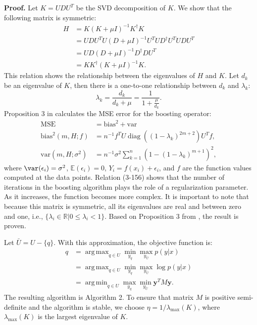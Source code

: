 \documentclass[12pt]{article}
\DeclareMathOperator*{\argmin}{arg\,min}
\DeclareMathOperator*{\argmax}{arg\,max}
\DeclareMathOperator{\diag}{diag}
\DeclareMathOperator{\MSE}{MSE}
\begin{document}
	\textbf{Proof.} Let $K = U D U^T$ be the SVD decomposition of $K$. We show that the following matrix is symmetric:
	\begin{align}
		H &= K(K + \mu I)^{-1} K^\dagger K \\
		&= U D U^T U (D + \mu I)^{-1} U^T U D^\dagger U^T U D U^T \\
		&= U D (D + \mu I)^{-1} D^\dagger D U^T \\
		&= K K^\dagger (K + \mu I)^{-1} K.
	\end{align}
	This relation shows the relationship between the eigenvalues of $H$ and $K$. Let $d_k$ be an eigenvalue of $K$, then there is a one-to-one relationship between $d_k$ and $\lambda_k$:
	\begin{equation}
		\lambda_k = \frac{d_k}{d_k + \mu} = \frac{1}{1 + \frac{\mu}{d_k}}.
	\end{equation}
	Proposition 3 in \cite{buhlmann2003boosting} calculates the MSE error for the boosting operator:
	\begin{align}
		\MSE &= \text{bias}^2 + \text{var} \\
		\text{bias}^2(m, H; f) &= n^{-1} f^T U \diag((1 - \lambda_k)^{2m+2}) U^T f, \\
		\text{var}(m, H; \sigma^2) &= n^{-1} \sigma^2 \sum_{k=1}^{n} \left( 1 - (1 - \lambda_k)^{m+1} \right)^2,
	\end{align}
	where $\var(\epsilon_i) = \sigma^2$, $\mathbb{E}(\epsilon_i) = 0$, $Y_i = f(x_i) + \epsilon_i$, and $f$ are the function values computed at the data points. Relation (3-156) shows that the number of iterations in the boosting algorithm plays the role of a regularization parameter. As it increases, the function becomes more complex. It is important to note that because this matrix is symmetric, all its eigenvalues are real and between zero and one, i.e., $\{\lambda_i \in \mathbb{R} | 0 \le \lambda_i < 1\}$. Based on Proposition 3 from \cite{buhlmann2003boosting}, the result is proven.
	
	Let $\bar{U} = U - \{q\}$. With this approximation, the objective function is:
	\begin{align}
		q &= \argmax_{q \in U} \min_{y_q} \max_{y_{\bar{U}}} p(y|x) \\
		&= \argmax_{q \in U} \min_{y_q} \max_{y_{\bar{U}}} \log p(y|x) \\
		&= \argmin_{q \in U} \max_{y_q} \min_{y_{\bar{U}}} \mathbf{y}^T M \mathbf{y}.
	\end{align}
	The resulting algorithm is Algorithm 2. To ensure that matrix $M$ is positive semi-definite and the algorithm is stable, we choose $\eta = 1 / \lambda_{\max}(K)$, where $\lambda_{\max}(K)$ is the largest eigenvalue of $K$.
	
\end{document}
